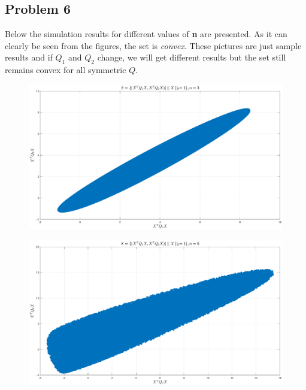 \documentclass[a4paper]{article}
\begin{document}
\subsection*{Problem 6}
\begin{Large}
	Below the simulation results for different values of \textbf{n} are presented. As it can clearly be seen from the figures, the set is \textit{convex}. These pictures are just sample results and if $ Q_1 $ and $ Q_2 $ change, we will get different results but the set still remains convex for all symmetric $ Q $.
	\begin{figure}[!h]
		\begin{center}
			\includegraphics[scale=.45]{q13}
		\end{center}
	\end{figure}
	\begin{figure}[!h]
		\begin{center}
			\includegraphics[scale=.45]{q16}
		\end{center}
	\end{figure}
	\begin{figure}[!h]
		\begin{center}

\end{center}
\end{figure}
\end{Large}
\end{document}
